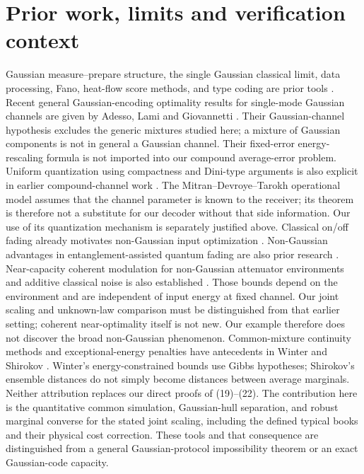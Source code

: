 \documentclass[11pt]{article}
\begin{document}
\section{Prior work, limits and verification context}

Gaussian measure--prepare structure, the single Gaussian classical
limit, data processing, Fano, heat-flow score methods, and type coding
are prior tools \cite{holevoEB,holevoReview,types,compound}.
Recent general Gaussian-encoding optimality results for single-mode
Gaussian channels are given by Adesso, Lami and Giovannetti
\cite{adesso2026}. Their Gaussian-channel hypothesis excludes the
generic mixtures studied here; a mixture of Gaussian components is not
in general a Gaussian channel. Their fixed-error energy-rescaling
formula is not imported into our compound average-error problem.
Uniform quantization using compactness and Dini-type arguments is also
explicit in earlier compound-channel work \cite{mitran,schaefer}.
The Mitran--Devroye--Tarokh operational model assumes that the channel
parameter is known to the receiver; its theorem is therefore not a
substitute for our decoder without that side information.
Our use of its quantization mechanism is separately justified above.
Classical on/off fading already motivates non-Gaussian input
optimization \cite{tu}. Non-Gaussian advantages in entanglement-assisted
quantum fading are also prior research \cite{catalano}.
Near-capacity coherent modulation for non-Gaussian attenuator environments
and additive classical noise is also established \cite{huber}.
Those bounds depend on the environment and are independent of input
energy at fixed channel. Our joint scaling and unknown-law comparison
must be distinguished from that earlier setting; coherent near-optimality
itself is not new. Our example therefore does not discover the broad
non-Gaussian phenomenon.
Common-mixture continuity methods and exceptional-energy penalties have
antecedents in Winter \cite{winter} and Shirokov \cite{shirokov}.
Winter's energy-constrained bounds use Gibbs hypotheses; Shirokov's
ensemble distances do not simply become distances between average
marginals. Neither attribution replaces our direct proofs of (19)--(22).
The contribution here is the quantitative common simulation, Gaussian-hull
separation, and robust marginal converse for the stated joint scaling,
including the defined typical books and their physical cost correction.
These tools and that consequence are distinguished from a general
Gaussian-protocol impossibility theorem or an exact Gaussian-code capacity.
\end{document}
